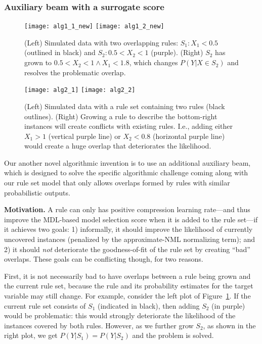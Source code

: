 \subsubsection{Auxiliary beam with a surrogate score} \label{subsec:auxiliary_beam}
\begin{figure}[ht]
    \centering
    \texttt{[image: alg1\_1\_new]}
    \texttt{[image: alg1\_2\_new]}
    \caption{(Left) Simulated data with two overlapping rules: $S_1: X_1 < 0.5$ (outlined in black) and $S_2: 0.5 < X_2 < 1$ (purple). (Right) $S_2$ has  grown to $0.5 < X_2 < 1 \land X_1 < 1.8$, which changes $P(Y|X \in S_2)$ and  resolves the problematic overlap.
    }
    \label{fig:alg1}
\end{figure}
\begin{figure}[ht]
    \centering
    \texttt{[image: alg2\_1]}
    \texttt{[image: alg2\_2]}
    \caption{(Left) Simulated data with a rule set containing two rules (black outlines). (Right) Growing a rule to describe the bottom-right instances will create conflicts with existing rules. I.e., adding either $X_1 > 1$ (vertical purple line) or $X_2 < 0.8$ (horizontal purple line) would create a huge overlap that deteriorates the likelihood.}
    \label{fig:alg2}
\end{figure}
Our another novel algorithmic invention is to use an additional auxiliary beam, which is designed to solve the specific algorithmic challenge coming along with our rule set model that only allows overlaps formed by rules with similar probabilistic outputs. 

\noindent \textbf{Motivation.} A rule can only has positive compression learning rate---and thus improve the MDL-based model selection score when it is added to the rule set---if it achieves two goals: 1) informally, it should improve the likelihood of currently uncovered instances (penalized by the approximate-NML normalizing term); and 2) it should \emph{not} deteriorate the goodness-of-fit of the rule set by creating ``bad'' overlaps. These goals can be conflicting though, for two reasons.
   
First, it is not necessarily bad to have overlaps between a rule being grown and the current rule set, because the rule and its probability estimates for the target variable may still change. For example, consider the left plot of Figure~\ref{fig:alg1}. If the current rule set consists of $S_1$ (indicated in black), then adding $S_2$ (in purple) would be problematic: this would strongly deteriorate the likelihood of the instances covered by both rules. However, as we further grow $S_2$, as shown in the right plot, we get $P(Y|S_1) = P(Y|S_2)$ and the problem is solved.

